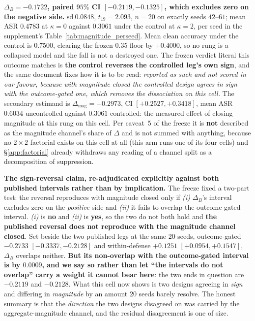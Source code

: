\documentclass{article}
\begin{document}
\textbf{$\Delta_B = \mathbf{-0.1722}$, paired $95\%$ CI $[-0.2119, -0.1325]$, which excludes zero on the negative side.} $\mathrm{sd}\ 0.0848$, $t_{19}{=}2.093$, $n{=}20$ on exactly seeds $42$--$61$; mean ASR $0.4783$ at $\kappa{=}0$ against $0.3061$ under the control at $\kappa{=}2$, per seed in the supplement's Table~\ref{tab:magnitude_perseed}. Mean clean accuracy under the control is $0.7500$, clearing the frozen $0.35$ floor by $+0.4000$, so no rung is a collapsed model and the fall is not a destroyed one. The frozen verdict literal this outcome matches is \textbf{the control reverses the controlled leg's own sign}, and the same document fixes how it is to be read: \emph{reported as such and not scored in our favour, because with magnitude closed the controlled design agrees in sign with the outcome-gated one, which removes the dissociation on this cell.} The secondary estimand is $\Delta_{\mathrm{mag}} = \mathbf{+0.2973}$, CI $[+0.2527, +0.3418]$, mean ASR $0.6034$ uncontrolled against $0.3061$ controlled: the measured effect of closing magnitude at this rung on this cell. Per caveat~5 of the freeze it is \textbf{not} described as the magnitude channel's share of $\Delta$ and is not summed with anything, because no $2\times2$ factorial exists on this cell at all (this arm runs one of its four cells) and §\ref{app:factorial} already withdraws any reading of a channel split as a decomposition of suppression.

\textbf{The sign-reversal claim, re-adjudicated explicitly against both published intervals rather than by implication.} The freeze fixed a two-part test: the reversal reproduces with magnitude closed only if \emph{(i)} $\Delta_B$'s interval excludes zero on the \emph{positive} side and \emph{(ii)} it fails to overlap the outcome-gated interval. \emph{(i)} is \textbf{no} and \emph{(ii)} is \textbf{yes}, so the two do not both hold and \textbf{the published reversal does not reproduce with the magnitude channel closed}. Set beside the two published legs at the same $20$ seeds, outcome-gated $-0.2733$ $[-0.3337,-0.2128]$ and within-defense $+0.1251$ $[+0.0954,+0.1547]$, $\Delta_B$ overlaps neither. \textbf{But its non-overlap with the outcome-gated interval is by $0.0009$, and we say so rather than let ``the intervals do not overlap'' carry a weight it cannot bear here}: the two ends in question are $-0.2119$ and $-0.2128$. What this cell now shows is two designs agreeing in \emph{sign} and differing in \emph{magnitude} by an amount $20$ seeds barely resolve. The honest summary is that the \emph{direction} the two designs disagreed on was carried by the aggregate-magnitude channel, and the residual disagreement is one of size.
\end{document}
